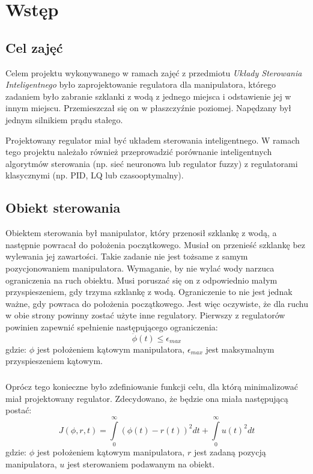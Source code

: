 \chapter{Wstęp}

\section{Cel zajęć}

Celem projektu wykonywanego w ramach zajęć z przedmiotu \textit{Układy Sterowania Inteligentnego} było zaprojektowanie regulatora dla manipulatora, którego zadaniem było zabranie szklanki z wodą z jednego miejsca i odstawienie jej w innym miejscu. Przemieszczał się on w płaszczyźnie poziomej. Napędzany był jednym silnikiem prądu stałego.

Projektowany regulator miał być układem sterowania inteligentnego. W ramach tego projektu należało również przeprowadzić porównanie inteligentnych algorytmów sterowania (np. sieć neuronowa lub regulator fuzzy) z regulatorami klasycznymi (np. PID, LQ lub czasooptymalny).

\section{Obiekt sterowania}

Obiektem sterowania był manipulator, który przenosił szklankę z wodą, a następnie powracał do położenia początkowego. Musiał on przenieść szklankę bez wylewania jej zawartości. Takie zadanie nie jest tożsame z samym pozycjonowaniem manipulatora. Wymaganie, by nie wylać wody narzuca ograniczenia na ruch obiektu. Musi poruszać się on z odpowiednio małym przyspieszeniem, gdy trzyma szklankę z wodą. Ograniczenie to nie jest jednak ważne, gdy powraca do położenia początkowego. Jest więc oczywiste, że dla ruchu w obie strony powinny zostać użyte inne regulatory. Pierwszy z regulatorów powinien zapewnić spełnienie następującego ograniczenia:
\begin{equation}
\ddot \phi(t) \leqslant \epsilon_{max}
\end{equation}
\noindent gdzie:\newline
\(\phi\) jest położeniem kątowym manipulatora,\newline
\(\epsilon_{max}\) jest maksymalnym przyspieszeniem kątowym.

\paragraph*{}
Oprócz tego konieczne było zdefiniowanie funkcji celu, dla którą minimalizować miał projektowany regulator. Zdecydowano, że będzie ona miała następującą postać:
\begin{equation}
J(\phi,r,t)=\int\limits_{0}^{\infty} (\phi(t)-r(t))^2dt+\int\limits_{0}^{\infty} u(t)^2dt
\end{equation}
\noindent gdzie:\newline
\(\phi\) jest położeniem kątowym manipulatora,\newline
\(r\) jest zadaną pozycją manipulatora,\newline
\(u\) jest sterowaniem podawanym na obiekt.

